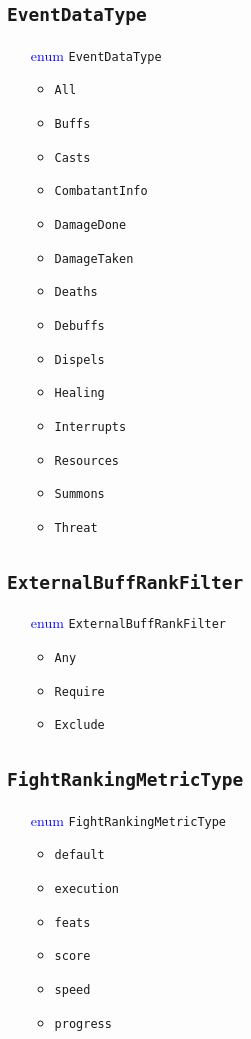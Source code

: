 \documentclass[10pt, a4paper]{memoir}
\numberwithin{equation}{section}
\theoremstyle{plain}
\theoremstyle{defp}
\theoremstyle{dotless}
\theoremstyle{definition}
\theoremstyle{dotless}
\theoremstyle{dotless}
\theoremstyle{defp}
\theoremstyle{defp}
\theoremstyle{be}          %
\theoremstyle{defp}
\newcommand\ttt[1]{\texttt{#1}}
\begin{document}
\subsection{\ttt{EventDataType}}\label{sec:EventDataType}
\begin{itemize}[noitemsep,topsep=1pt]
\item[\textcolor{blue}{enum}] \ttt{EventDataType}
\begin{itemize}[itemsep=1pt,topsep=1pt]
\item \ttt{All}
\item \ttt{Buffs}
\item \ttt{Casts}
\item \ttt{CombatantInfo}
\item \ttt{DamageDone}
\item \ttt{DamageTaken}
\item \ttt{Deaths}
\item \ttt{Debuffs}
\item \ttt{Dispels}
\item \ttt{Healing}
\item \ttt{Interrupts}
\item \ttt{Resources}
\item \ttt{Summons}
\item \ttt{Threat}
\end{itemize}
\end{itemize}


\subsection{\ttt{ExternalBuffRankFilter}}\label{sec:ExternalBuffRankFilter}
\begin{itemize}[noitemsep,topsep=1pt]
\item[\textcolor{blue}{enum}] \ttt{ExternalBuffRankFilter}
\begin{itemize}[itemsep=1pt,topsep=1pt]
\item \ttt{Any}
\item \ttt{Require}
\item \ttt{Exclude}
\end{itemize}
\end{itemize}


\subsection{\ttt{FightRankingMetricType}}\label{sec:FightRankingMetricType}
\begin{itemize}[noitemsep,topsep=1pt]
\item[\textcolor{blue}{enum}] \ttt{FightRankingMetricType}
\begin{itemize}[itemsep=1pt,topsep=1pt]
\item \ttt{default}
\item \ttt{execution}
\item \ttt{feats}
\item \ttt{score}
\item \ttt{speed}
\item \ttt{progress}
\end{itemize}
\end{itemize}
\end{document}
